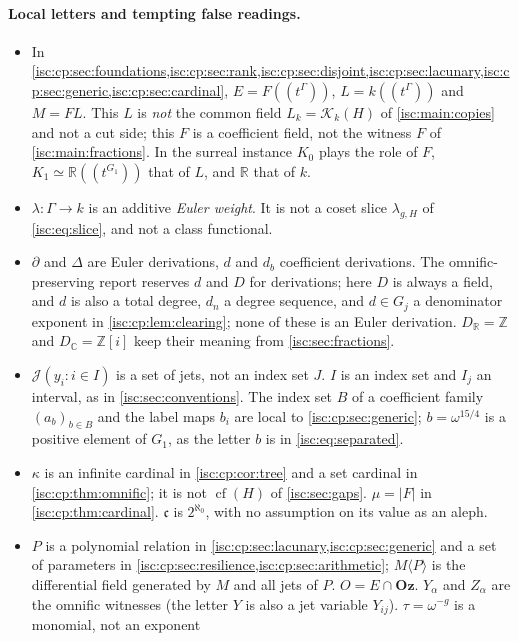 \documentclass[11pt,letterpaper]{article}
\theoremstyle{definition}
\theoremstyle{remark}
\newcommand{\Oz}{\mathbf{Oz}}
\newcommand{\R}{\mathbb R}
\newcommand{\C}{\mathbb C}
\newcommand{\Z}{\mathbb Z}
\newcommand{\K}[2]{\mathcal K_{#1}(#2)}
\newcommand{\cf}{\operatorname{cf}}
\newcommand{\cc}{\mathfrak c}
\newcommand{\jet}{\mathcal J}
\numberwithin{equation}{section}
\begin{document}
\paragraph{Local letters and tempting false readings.}
\begin{itemize}[leftmargin=*,itemsep=3pt]
\item In
\cref{isc:cp:sec:foundations,isc:cp:sec:rank,isc:cp:sec:disjoint,isc:cp:sec:lacunary,isc:cp:sec:generic,isc:cp:sec:cardinal},
$E=F((t^\Gamma))$, $L=k((t^\Gamma))$ and $M=FL$. This $L$ is \emph{not} the
common field $L_k=\K{k}{H}$ of \cref{isc:main:copies} and not a cut side;
this $F$ is a coefficient field, not the witness $F$ of
\cref{isc:main:fractions}. In the surreal instance $K_0$ plays the role of
$F$, $K_1\simeq\R((t^{G_1}))$ that of $L$, and $\R$ that of $k$.
\item $\lambda:\Gamma\to k$ is an additive \emph{Euler weight}. It is not a
coset slice $\lambda_{g,H}$ of \eqref{isc:eq:slice}, and not a class
functional.
\item $\partial$ and $\Delta$ are Euler derivations, $d$ and $d_b$
coefficient derivations. The omnific-preserving report reserves $d$ and $D$
for derivations; here $D$ is always a field, and $d$ is also a total degree,
$d_n$ a degree sequence, and $d\in G_j$ a denominator exponent in
\cref{isc:cp:lem:clearing}; none of these is an Euler derivation.
$D_\R=\Z$ and $D_\C=\Z[i]$ keep their meaning from \cref{isc:sec:fractions}.
\item $\jet(y_i:i\in I)$ is a set of jets, not an index set $J$. $I$ is an
index set and $I_j$ an interval, as in \cref{isc:sec:conventions}. The
index set $B$ of a coefficient family $(a_b)_{b\in B}$ and the label maps
$b_i$ are local to \cref{isc:cp:sec:generic}; $b=\omega^{15/4}$ is a
positive element of $G_1$, as the letter $b$ is in \eqref{isc:eq:separated}.
\item $\kappa$ is an infinite cardinal in \cref{isc:cp:cor:tree} and a set
cardinal in \cref{isc:cp:thm:omnific}; it is not $\cf(H)$ of
\cref{isc:sec:gaps}. $\mu=|F|$ in \cref{isc:cp:thm:cardinal}. $\cc$ is
$2^{\aleph_0}$, with no assumption on its value as an aleph.
\item $P$ is a polynomial relation in
\cref{isc:cp:sec:lacunary,isc:cp:sec:generic} and a set of parameters in
\cref{isc:cp:sec:resilience,isc:cp:sec:arithmetic}; $M\langle P\rangle$ is
the differential field generated by $M$ and all jets of $P$. $O=E\cap\Oz$.
$Y_\alpha$ and $Z_\alpha$ are the omnific witnesses (the letter $Y$ is also a
jet variable $Y_{ij}$). $\tau=\omega^{-g}$ is a monomial, not an exponent

\end{itemize}
\end{document}
